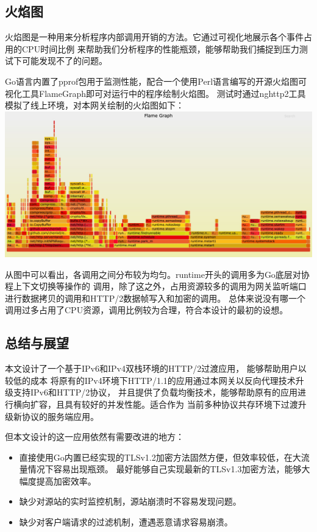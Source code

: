 \documentclass[twoside]{CUGThesis}
\begin{document}
	\subsection{火焰图}
	火焰图是一种用来分析程序内部调用开销的方法\cite{gregg2017visualizing}。它通过可视化地展示各个事件占用的CPU时间比例
	来帮助我们分析程序的性能瓶颈，能够帮助我们捕捉到压力测试下可能发现不了的问题。\par
	Go语言内置了pprof包用于监测性能，配合一个使用Perl语言编写的开源火焰图可视化工具FlameGraph即可对运行中的程序绘制火焰图。
	测试时通过nghttp2工具模拟了线上环境，对本网关绘制的火焰图如下：\\
	\includegraphics[scale=0.158]{Figures/flame_graph_simple.jpg}
	\par 
	从图中可以看出，各调用之间分布较为均匀。runtime开头的调用多为Go底层对协程上下文切换等操作的
	调用，除了这之外，占用资源较多的调用为网关监听端口进行数据拷贝的调用和HTTP/2数据帧写入和加密的调用。
	总体来说没有哪一个调用过多占用了CPU资源，调用比例较为合理，符合本设计的最初的设想。

	\begin{spacing}{2}
		\section{总结与展望}
	\end{spacing}
	 本文设计了一个基于IPv6和IPv4双栈环境的HTTP/2过渡应用， 能够帮助用户以较低的成本
	 将原有的IPv4环境下HTTP/1.1的应用通过本网关以反向代理技术升级支持IPv6和HTTP/2协议，
	 并且提供了负载均衡技术，能够帮助原有的应用进行横向扩容，且具有较好的并发性能。适合作为
	 当前多种协议共存环境下过渡升级新协议的服务端应用。\par 
	 但本文设计的这一应用依然有需要改进的地方：
	 \begin{itemize}
		\item 直接使用Go内置已经实现的TLSv1.2加密方法固然方便，但效率较低，在大流量情况下容易出现瓶颈。
		最好能够自己实现最新的TLSv1.3加密方法，能够大幅度提高加密效率。
		\item 缺少对源站的实时监控机制，源站崩溃时不容易发现问题。
		\item 缺少对客户端请求的过滤机制，遭遇恶意请求容易崩溃。
	 \end{itemize}
	
\end{document}
